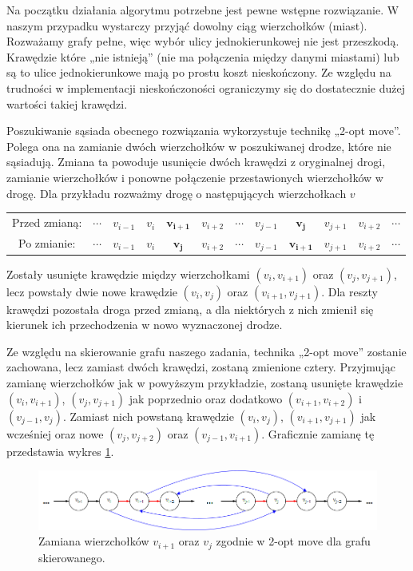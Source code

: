 \documentclass[11pt,a4paper,twoside]{article}
\begin{document}
Na początku działania algorytmu potrzebne jest pewne wstępne rozwiązanie. W naszym przypadku wystarczy przyjąć dowolny ciąg wierzchołków (miast). Rozważamy grafy pełne, więc wybór ulicy jednokierunkowej nie jest przeszkodą. Krawędzie które „nie istnieją” (nie ma połączenia między danymi miastami) lub są to ulice jednokierunkowe mają po prostu koszt nieskończony. Ze względu na trudności w implementacji nieskończoności ograniczymy się do dostatecznie dużej wartości takiej krawędzi.

Poszukiwanie sąsiada obecnego rozwiązania wykorzystuje technikę „2-opt move”. Polega ona na zamianie dwóch wierzchołków w poszukiwanej drodze, które nie sąsiadują. Zmiana ta powoduje usunięcie dwóch krawędzi z oryginalnej drogi, zamianie wierzchołków i ponowne połączenie przestawionych wierzchołków w drogę. Dla przykładu rozważmy drogę o następujących wierzchołkach $v$

\bgroup
\def\arraystretch{1.5}
\begin{tabular}{cccccccccccc}
Przed zmianą: & $\cdots$ & $v_{i-1}$ & $v_{i}$ & $\mathbf{v_{i+1}}$ & $v_{i+2}$ & $\cdots$ & $v_{j-1}$ & $\mathbf{v_{j}}$ & $v_{j+1}$ & $v_{i+2}$ & $\cdots$\\
Po zmianie: & $\cdots$ & $v_{i-1}$ & $v_{i}$ & $\mathbf{v_{j}}$ & $v_{i+2}$ & $\cdots$ & $v_{j-1}$ & $\mathbf{v_{i+1}}$ & $v_{j+1}$ & $v_{i+2}$ & $\cdots$\\
\end{tabular}
\egroup

Zostały usunięte krawędzie między wierzchołkami $(v_{i}, v_{i+1})$ oraz $(v_{j}, v_{j+1})$, lecz powstały dwie nowe krawędzie $(v_{i}, v_{j})$ oraz $(v_{i+1}, v_{j+1})$. Dla reszty krawędzi pozostała droga przed zmianą, a dla niektórych z nich zmienił się kierunek ich przechodzenia w nowo wyznaczonej drodze.

Ze względu na skierowanie grafu naszego zadania, technika „2-opt move” zostanie zachowana, lecz zamiast dwóch krawędzi, zostaną zmienione cztery. Przyjmując zamianę wierzchołków jak w powyższym przykładzie, zostaną usunięte krawędzie $(v_{i}, v_{i+1})$, $(v_{j}, v_{j+1})$ jak poprzednio oraz dodatkowo $(v_{i+1}, v_{i+2})$ i $(v_{j-1}, v_{j})$. Zamiast nich powstaną krawędzie $(v_{i}, v_{j})$, $(v_{i+1}, v_{j+1})$ jak wcześniej oraz nowe $(v_{j}, v_{j+2})$ oraz $(v_{j-1}, v_{i+1})$. Graficznie zamianę tę przedstawia wykres \ref{2optMove}.

\begin{figure}[ht]
\vspace{-20pt}
\centering
\includegraphics[width=15cm]{2optMove}
\caption{Zamiana wierzchołków $v_{i+1}$ oraz $v_{j}$ zgodnie w 2-opt move dla grafu skierowanego.}
\label{2optMove}
\end{figure}
\end{document}
